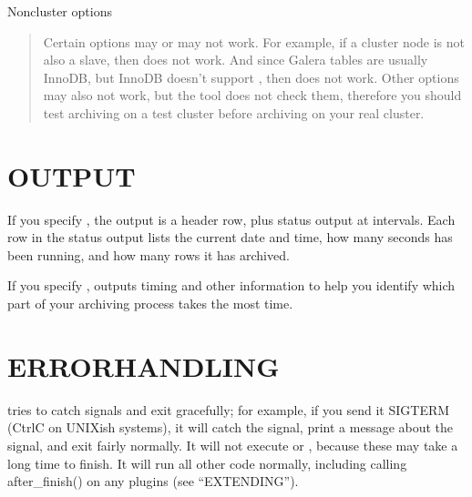 \documentclass[letterpaper,10pt,english]{sphinxmanual}
\begin{document}
\sphinxAtStartPar
Non\sphinxhyphen{}cluster options
\begin{quote}

\sphinxAtStartPar
Certain options may or may not work.  For example, if a cluster node
is not also a slave, then {\hyperref[\detokenize{mariadb-archiver:cmdoption-mariadb-archiver-check-slave-lag}]{}} does not work.  And since Galera
tables are usually InnoDB, but InnoDB doesn’t support , then
{\hyperref[\detokenize{mariadb-archiver:cmdoption-mariadb-archiver-delayed-insert}]{}} does not work.  Other options may also not work, but
the tool does not check them, therefore you should test archiving on a test
cluster before archiving on your real cluster.
\end{quote}


\section{OUTPUT}
\label{\detokenize{mariadb-archiver:output}}
\sphinxAtStartPar
If you specify {\hyperref[\detokenize{mariadb-archiver:cmdoption-mariadb-archiver-progress}]{}}, the output is a header row, plus status output
at intervals.  Each row in the status output lists the current date and time,
how many seconds  has been running, and how many rows it has
archived.

\sphinxAtStartPar
If you specify {\hyperref[\detokenize{mariadb-archiver:cmdoption-mariadb-archiver-statistics}]{}},  outputs timing and other
information to help you identify which part of your archiving process takes the
most time.


\section{ERROR\sphinxhyphen{}HANDLING}
\label{\detokenize{mariadb-archiver:error-handling}}
\sphinxAtStartPar
{} tries to catch signals and exit gracefully; for example, if you
send it SIGTERM (Ctrl\sphinxhyphen{}C on UNIX\sphinxhyphen{}ish systems), it will catch the signal, print a
message about the signal, and exit fairly normally.  It will not execute
{\hyperref[\detokenize{mariadb-archiver:cmdoption-mariadb-archiver-analyze}]{}} or {\hyperref[\detokenize{mariadb-archiver:cmdoption-mariadb-archiver-optimize}]{}}, because these may take a long time to finish.
It will run all other code normally, including calling after\_finish() on any
plugins (see “EXTENDING”).
\end{document}
